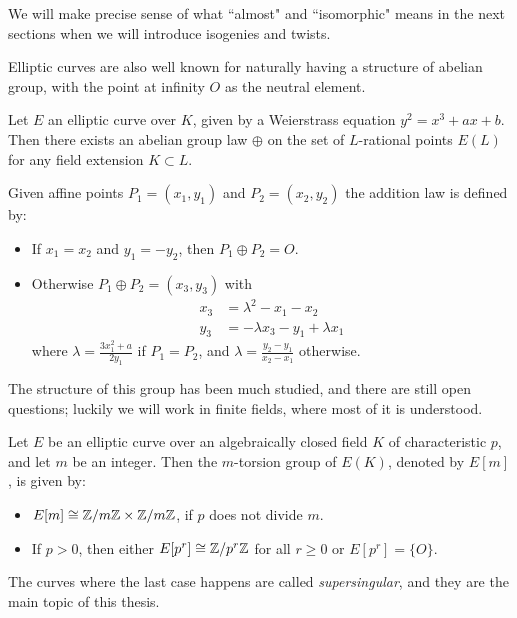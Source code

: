 We will make precise sense of what ``almost" and ``isomorphic" means in the next sections when we will introduce isogenies and twists.

Elliptic curves are also well known for naturally having a structure of abelian group, with the point at infinity $O$ as the neutral element.

\begin{theorem}
    Let $E$ an elliptic curve over $K$, given by a Weierstrass equation $y^2=x^3+ax+b$. Then there exists an abelian group law $\oplus$ on the set of $L$-rational points $E(L)$ for any field extension $K\subset L$.
    
    Given affine points $P_1=(x_1,y_1)$ and $P_2=(x_2,y_2)$ the addition law is defined by:
    \begin{itemize}
        \item If $x_1=x_2$ and $y_1=-y_2$, then $P_1\oplus P_2=O$.
        \item Otherwise $P_1\oplus P_2=(x_3,y_3)$ with \begin{align*}
            x_3 &=  \lambda^2-x_1-x_2\\
            y_3 &= -\lambda x_3-y_1+\lambda x_1
        \end{align*}
        where $\lambda=\frac{3x_1^2+a}{2y_1}$ if $P_1=P_2$, and $\lambda=\frac{y_2-y_1}{x_2-x_1}$ otherwise.
    \end{itemize}
\end{theorem}

The structure of this group has been much studied, and there are still open questions; luckily we will work in finite fields, where most of it is understood.

\begin{theorem}
    Let $E$ be an elliptic curve over an algebraically closed field $K$ of characteristic $p$, and let $m$ be an integer. Then the $m$-torsion group of $E(K)$, denoted by $E[m]$, is given by:
    \begin{itemize}
        \item $E[m]\cong \mathbb{Z}/m\mathbb{Z}\times\mathbb{Z}/m\mathbb{Z}$, if $p$ does not divide $m$.
        \item If $p>0$, then either $E[p^r]\cong\mathbb{Z}/p^r\mathbb{Z}$ for all $r\ge0$ or $E[p^r]=\{O\}$.
    \end{itemize}
\end{theorem}

The curves where the last case happens are called \emph{supersingular}, and they are the main topic of this thesis.

